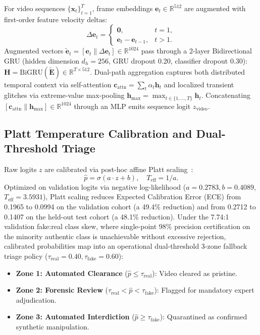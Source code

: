 \documentclass[10pt,twocolumn,letterpaper]{article}
\begin{document}
For video sequences $\{\mathbf{x}_t\}_{t=1}^T$, frame embeddings $\mathbf{e}_t \in \mathbb{R}^{512}$ are augmented with first-order feature velocity deltas:
\begin{equation}
\label{eq:velocity_delta}
\Delta \mathbf{e}_t = \begin{cases} \mathbf{0}, & t = 1, \\ \mathbf{e}_t - \mathbf{e}_{t-1}, & t > 1. \end{cases}
\end{equation}
Augmented vectors $\tilde{\mathbf{e}}_t = [\mathbf{e}_t \parallel \Delta \mathbf{e}_t] \in \mathbb{R}^{1024}$ pass through a 2-layer Bidirectional GRU (hidden dimension $d_h = 256$, GRU dropout 0.20, classifier dropout 0.30): $\mathbf{H} = \mathrm{BiGRU}(\tilde{\mathbf{E}}) \in \mathbb{R}^{T \times 512}$. Dual-path aggregation captures both distributed temporal context via self-attention $\mathbf{c}_{\mathrm{attn}} = \sum_t \alpha_t \mathbf{h}_t$ and localized transient glitches via extreme-value max-pooling $\mathbf{h}_{\max} = \max_{t \in \{1,\dots,T\}} \mathbf{h}_t$. Concatenating $[\mathbf{c}_{\mathrm{attn}} \parallel \mathbf{h}_{\max}] \in \mathbb{R}^{1024}$ through an MLP emits sequence logit $z_{\mathrm{video}}$.

\subsection{Platt Temperature Calibration and Dual-Threshold Triage}
\label{sec:method_calibration}

Raw logits $z$ are calibrated via post-hoc affine Platt scaling~\cite{platt1999probabilistic}:
\begin{equation}
\label{eq:platt_scaling}
\hat{p} = \sigma(a \cdot z + b), \quad T_{\mathrm{eff}} = 1/a.
\end{equation}
Optimized on validation logits via negative log-likelihood ($a = 0.2783, b = 0.4089$, $T_{\mathrm{eff}} = 3.5931$), Platt scaling reduces Expected Calibration Error (ECE) from 0.1965 to 0.0994 on the validation cohort (a 49.4\% reduction) and from 0.2712 to 0.1407 on the held-out test cohort (a 48.1\% reduction). Under the 7.74:1 validation fake:real class skew, where single-point 98\% precision certification on the minority authentic class is unachievable without excessive rejection, calibrated probabilities map into an operational dual-threshold 3-zone fallback triage policy ($\tau_{\mathrm{real}} = 0.40, \tau_{\mathrm{fake}} = 0.60$):
\begin{itemize}
\item \textbf{Zone 1: Automated Clearance} ($\hat{p} \le \tau_{\mathrm{real}}$): Video cleared as pristine.
\item \textbf{Zone 2: Forensic Review} ($\tau_{\mathrm{real}} < \hat{p} < \tau_{\mathrm{fake}}$): Flagged for mandatory expert adjudication.
\item \textbf{Zone 3: Automated Interdiction} ($\hat{p} \ge \tau_{\mathrm{fake}}$): Quarantined as confirmed synthetic manipulation.
\end{itemize}
\end{document}
